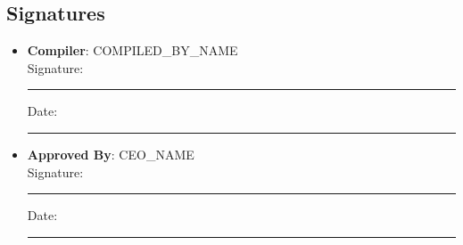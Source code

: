 \documentclass[11pt]{article}
\newcommand{\compilerName}{{{COMPILED_BY_NAME}}}
\begin{document}
\subsection*{Signatures}
\begin{itemize}
  \item \textbf{Compiler}: \compilerName \\
    Signature: \rule{5cm}{0.4pt} \quad Date: \rule{3cm}{0.4pt}
  \item \textbf{Approved By}: {{CEO_NAME}} \\
    Signature: \rule{5cm}{0.4pt} \quad Date: \rule{3cm}{0.4pt}
\end{itemize}
\end{document}
